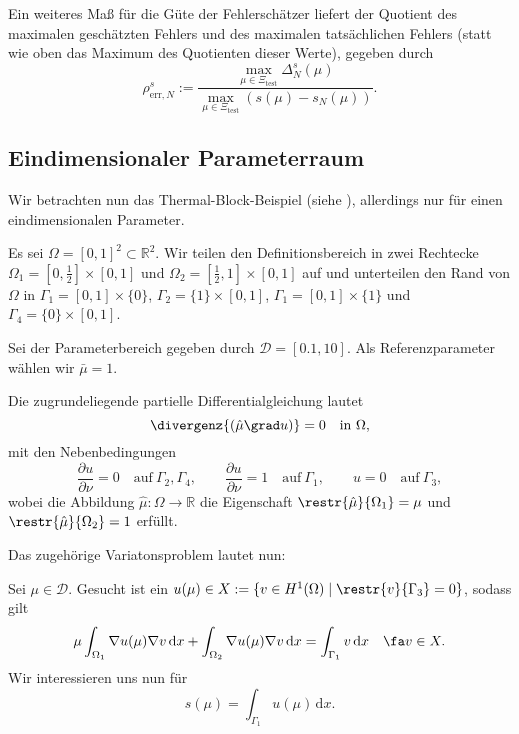Ein weiteres Maß für die Güte der Fehlerschätzer liefert der Quotient des maximalen geschätzten Fehlers und des maximalen tatsächlichen Fehlers (statt wie oben das Maximum des Quotienten dieser Werte), gegeben durch
\begin{equation}
     \rho^s_{\text{err},N} := \frac{\max\limits_{\mu \in \Xi_\text{test}} \Delta_N^s(\mu)}{\max\limits_{\mu \in \Xi_\text{test}} (s(\mu) - s_N(\mu))}.
\end{equation}


\subsection{Eindimensionaler Parameterraum} %
\label{sub:eindimensionaler_parameterraum}


Wir betrachten nun das Thermal-Block-Beispiel (siehe \cite[2.2.1]{Paro}), allerdings nur für einen eindimensionalen Parameter.

Es sei $\Omega = [ 0, 1 ]^2 \subset \mathbb{R}^2$. Wir teilen den Definitionsbereich in zwei Rechtecke $\Omega_1 = [0, \frac{1}{2}] \times [ 0, 1 ] $ und $\Omega_2 = [ \frac{1}{2}, 1 ] \times [ 0, 1 ]$ auf und unterteilen den Rand von $\Omega$ in $\Gamma_1 = [0, 1] \times \{ 0 \}$, $\Gamma_2 = \{ 1 \} \times [0, 1]$, $\Gamma_1 = [0, 1] \times \{ 1 \}$ und $\Gamma_4 = \{ 0 \} \times [0, 1]$.

Sei der Parameterbereich gegeben durch $\mathcal D = [0.1, 10]$. Als Referenzparameter wählen wir $\bar \mu = 1$.

Die zugrundeliegende partielle Differentialgleichung lautet
\begin{equation}
    \divergenz{(\hat \mu \grad u)}  = 0 \quad \text{in}~\Omega,
\end{equation}
mit den Nebenbedingungen
\begin{equation}
        \frac{\partial u}{\partial \nu} = 0 \quad \text{auf}~\Gamma_2, \Gamma_4, \qquad
    \frac{\partial u}{\partial \nu} = 1 \quad \text{auf}~\Gamma_1, \qquad
    u                               = 0 \quad \text{auf}~\Gamma_3,
\end{equation}
wobei die Abbildung $\hat \mu \colon \Omega \to \mathbb{R}$ die Eigenschaft $\restr{\hat \mu}{\Omega_1} = \mu$ und $\restr{\hat \mu}{\Omega_2} = 1$ erfüllt.

Das zugehörige Variatonsproblem lautet nun:
\begin{addmargin}[2em]{2em}
Sei $\mu \in \mathcal D$. Gesucht ist ein $u(\mu) \in X := \{ v \in H^1(\Omega) \mid \restr{v}{\Gamma_3} = 0 \}$, sodass gilt
\begin{equation}
    \mu \int_{\Omega_1} \nabla u(\mu) \nabla v \, \mathrm d x + \int_{\Omega_2} \nabla u(\mu) \nabla v \, \mathrm d x = \int_{\Gamma_1} v \, \mathrm{d} x \quad \fa v \in X.
\end{equation}
Wir interessieren uns nun für
\begin{equation}
    s(\mu) = \int_{\Gamma_1} u(\mu) \, \mathrm{d}x.
\end{equation}
\end{addmargin}

